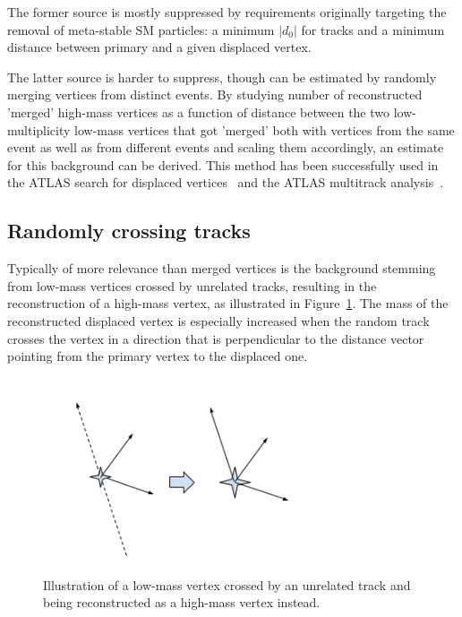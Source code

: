 The former source is mostly suppressed by requirements originally targeting the removal of meta-stable SM particles: a minimum $|d_0|$ for tracks and a minimum distance between primary and a given displaced vertex.

The latter source is harder to suppress, though can be estimated by randomly merging vertices from distinct events. By studying number of reconstructed 'merged' high-mass vertices as a function of distance between the two low-multiplicity low-mass vertices that got 'merged' both with vertices from the same event as well as from different events and scaling them accordingly, an estimate for this background can be derived. This method has been successfully used in the ATLAS search for displaced vertices~\cite{Aaboud:2017iio} and the ATLAS multitrack analysis~\cite{Aad:2015rba}.

\subsection{Randomly crossing tracks} %

Typically of more relevance than merged vertices is the background stemming from low-mass vertices crossed by unrelated tracks, resulting in the reconstruction of a high-mass vertex, as illustrated in Figure~\ref{fig:randomcrossing}. The mass of the reconstructed displaced vertex is especially increased when the random track crosses the vertex in a direction that is perpendicular to the distance vector pointing from the primary vertex to the displaced one.

\begin{figure}[h]
  \centering
  \includegraphics[width=0.7\textwidth]{figures/randomcrossing.png}
  \caption{Illustration of a low-mass vertex crossed by an unrelated track and being reconstructed as a high-mass vertex instead.}
  \label{fig:randomcrossing}
\end{figure}

